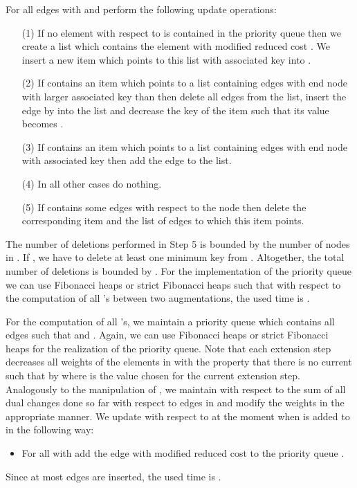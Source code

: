 \documentclass[12pt,twoside,a4paper]{article}
\begin{document}
\medskip
For all edges  with  and  perform 
the following update operations: 
\begin{itemize}
\item[(1)]
If no element with respect to  is contained in the priority queue then
we create a list which contains the element  with modified reduced cost 
. We insert a new item which points to this list with associated
key  into .
\item[(2)]
If  contains an item which points to a list containing edges with end node
 with larger associated key than  
then delete all edges from the list, insert the edge by  into the list and 
decrease the key of the item such that its value becomes .
\item[(3)]
If  contains an item which points to a list containing edges with end node
 with associated key  then add the edge  to the 
list.
\item[(4)]
In all other cases do nothing.
\item[(5)]
If  contains some edges with respect to the node  then 
delete the corresponding item and the list of edges to which this item points.
\end{itemize}
The number of deletions performed in Step 5 is bounded by the number of nodes
in . If , we have to delete at least one minimum
key from . Altogether, the total number of deletions is bounded by .
For the implementation of the priority queue  we can use
Fibonacci heaps \cite{FrTa} or strict Fibonacci heaps \cite{BrLaTa} such that
with respect to the computation of all 's between two
augmentations, the used time is .

For the computation of all 's, we maintain a priority queue 
 which contains all edges  such that  
and .
Again, we can use Fibonacci heaps or strict Fibonacci heaps for the realization 
of the priority queue.
Note that each extension step decreases all weights of the elements  
in  with the property that there is no current  such that 
 by  where  is the value chosen for the 
current extension step.
Analogously to the manipulation of , we maintain with respect to 
 the sum  of all dual changes done so far with respect to 
edges in  and modify the weights in the appropriate manner.
We update  with respect to  
at the moment when  is added to  in the following way:
\begin{itemize}
\item
For all  with  add the edge  with modified
reduced cost  to the priority queue .
\end{itemize}
Since at most  edges are inserted, the used time is .
 
\end{document}
